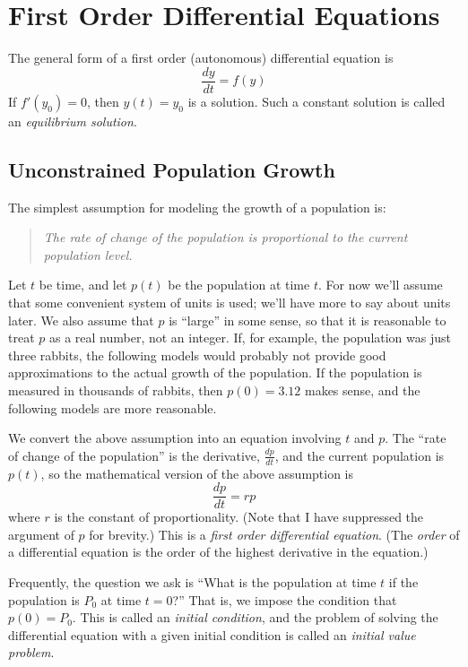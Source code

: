 \documentclass{book}
\begin{document}
\section{First Order Differential Equations}
The general form of a first order (autonomous) differential
equation is
\[
   \frac{dy}{dt} = f(y)
\]
\noindent
If  $f'(y_{0})=0$, then $y(t)=y_{0}$ is a solution.  Such a constant
solution is called an \emph{equilibrium solution}.

\subsection{Unconstrained Population Growth}


The simplest assumption for modeling the growth of a population
is:
\begin{quote}
\emph{The rate of change of the population is proportional to the current population level.}
\end{quote} 
Let $t$ be time, and let $p(t)$ be the population at time $t$.
For now we'll assume that some convenient system of units is used;
we'll have more to say about units later.
We also assume that $p$ is ``large'' in some sense, so that it is reasonable
to treat $p$ as a real number, not an integer.  If, for example, the population
was just three rabbits, the following models would probably not provide good
approximations to the actual growth of the population.  If the population
is measured in thousands of rabbits, then $p(0)=3.12$ makes sense,
and the following models are more reasonable.

We convert the above assumption into an equation involving $t$
and $p$.
The ``rate of change of the population'' is the derivative, $\frac{dp}{dt}$, and the
current population is $p(t)$, so the mathematical version of the above
assumption is
\begin{equation}
  \frac{dp}{dt} = rp
\end{equation}
where $r$ is the constant of proportionality.
(Note that I have suppressed the argument of $p$ for brevity.)
This is a \emph{first order differential equation}.
(The \emph{order} of a differential equation is the order of the
highest derivative in the equation.)

Frequently, the question we ask is ``What is the population at time $t$
if the population is $P_0$ at time $t=0$?''  That is, we impose the
condition that $p(0)=P_0$.  This is called an
\emph{initial condition}, and the problem of solving the differential
equation with a given initial condition is called an
\emph{initial value problem}.
\end{document}

